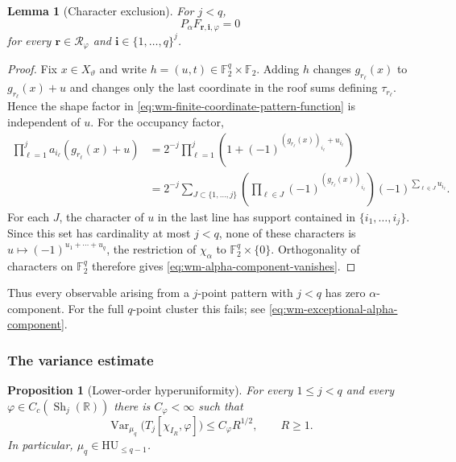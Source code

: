 \documentclass[11pt,reqno,a4paper]{amsart}
\numberwithin{equation}{section}
\theoremstyle{compact}
\newtheorem{proposition}[proposition]{Proposition}
\newtheorem{lemma}[lemma]{Lemma}
\theoremstyle{definition}
\theoremstyle{definition}
\newcommand{\HU}{\mathrm{HU}}
\newcommand{\Var}{\operatorname{Var}}
\newcommand{\Sh}{\operatorname{Sh}}
\begin{document}
\begin{lemma}[Character exclusion]
\label{lem:wm-character-exclusion}
For $j<q$,
\begin{equation}\label{eq:wm-alpha-component-vanishes}
  P_\alpha F_{\mathbf r,\mathbf i,\varphi}=0
\end{equation}
for every $\mathbf r\in\mathscr R_\varphi$ and
$\mathbf i\in\{1,\ldots,q\}^j$.
\end{lemma}

\begin{proof}
Fix $x\in X_\vartheta$ and write $h=(u,t)\in\mathbb F_2^q\times\mathbb F_2$.
Adding $h$ changes $g_{r_\ell}(x)$ to $g_{r_\ell}(x)+u$ and changes only the
last coordinate in the roof sums defining $\tau_{r_\ell}$.  Hence the shape
factor in \eqref{eq:wm-finite-coordinate-pattern-function} is independent of
$u$.  For the occupancy factor,
\begin{equation}\label{eq:wm-occupancy-character-expansion}
\begin{aligned}
  \prod_{\ell=1}^j a_{i_\ell}(g_{r_\ell}(x)+u)
  &=2^{-j}\prod_{\ell=1}^j
    \left(1+(-1)^{(g_{r_\ell}(x))_{i_\ell}+u_{i_\ell}}\right) \\
  &=2^{-j}\sum_{J\subset\{1,\ldots,j\}}
    \left(\prod_{\ell\in J}(-1)^{(g_{r_\ell}(x))_{i_\ell}}\right)
    (-1)^{\sum_{\ell\in J}u_{i_\ell}}.
\end{aligned}
\end{equation}
For each $J$, the character of $u$ in the last line has support contained in
$\{i_1,\ldots,i_j\}$.  Since this set has cardinality at most $j<q$, none
of these characters is $u\mapsto(-1)^{u_1+\cdots+u_q}$, the restriction of
$\chi_\alpha$ to $\mathbb F_2^q\times\{0\}$.  Orthogonality of characters on
$\mathbb F_2^q$ therefore gives \eqref{eq:wm-alpha-component-vanishes}.
\end{proof}

Thus every observable arising from a $j$-point pattern with $j<q$ has zero
$\alpha$-component.  For the full $q$-point cluster this fails; see
\eqref{eq:wm-exceptional-alpha-component}.

\subsubsection{The variance estimate}

\begin{proposition}[Lower-order hyperuniformity]
\label{prop:wm-lower-order-hu}
For every $1\leq j<q$ and every
$\varphi\in C_c(\Sh_j(\mathbb R))$ there is $C_\varphi<\infty$ such that
\begin{equation}\label{eq:wm-lower-order-variance}
  \Var_{\mu_q}\bigl(T_j[\chi_{I_R},\varphi]\bigr)
  \leq C_\varphi R^{1/2},
  \qquad R\geq1.
\end{equation}
In particular, $\mu_q\in\HU_{\leq q-1}$.
\end{proposition}
\end{document}
